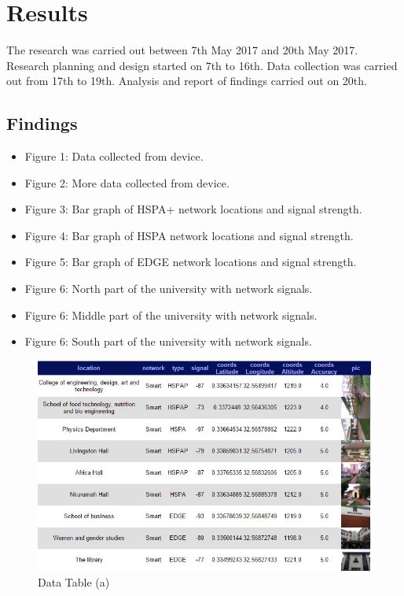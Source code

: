 \documentclass{article}
\begin{document}
\section{Results}
The research was carried out between 7th May 2017 and 20th May 2017. Research planning and design started on 7th to 16th. Data collection was carried out from 17th to 19th. Analysis and report of findings carried out on 20th.

\subsection{Findings}
\begin{itemize}
\item
Figure 1: Data collected from device.
\item
Figure 2: More data collected from device.
\item
Figure 3: Bar graph of HSPA+  network locations and signal strength.
\item
Figure 4: Bar graph of HSPA  network locations and signal strength.
\item
Figure 5: Bar graph of EDGE  network locations and signal strength.
\item
Figure 6: North part of the university with network signals.
\item
Figure 6: Middle part of the university with network signals.
\item
Figure 6: South part of the university with network signals.
\end{itemize}
	
\begin{figure}
  \includegraphics[width=\linewidth]{tableone.jpg}
  \caption{Data Table (a)}
  \label{fig:dt1}
\end{figure}
\end{document}
